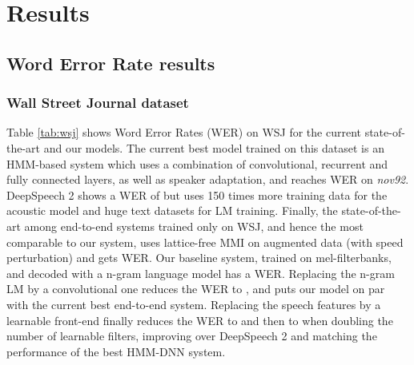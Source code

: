 \documentclass[a4paper]{article}
\begin{document}
\section{Results}
\label{sec:results}

\subsection{Word Error Rate results}

\subsubsection{Wall Street Journal dataset}
Table \ref{tab:wsj} shows Word Error Rates (WER) on WSJ for the current state-of-the-art and our models. The current best model trained on this dataset is an HMM-based system which uses a combination of convolutional, recurrent and fully connected layers, as well as speaker adaptation, and reaches  WER on \textit{nov92}. DeepSpeech 2 shows a WER of  but uses 150 times more training data for the acoustic model and huge text datasets for LM training. Finally, the state-of-the-art among end-to-end systems trained only on WSJ, and hence the most comparable to our system, uses lattice-free MMI on augmented data (with speed perturbation) and gets  WER. Our baseline system, trained on mel-filterbanks, and decoded with a n-gram language model has a  WER. Replacing the n-gram LM by a convolutional one reduces the WER to , and puts our model on par with the current best end-to-end system. Replacing the speech features by a learnable front-end finally reduces the WER to  and then to  when doubling the number of learnable filters, improving over DeepSpeech 2 and matching the performance of the best HMM-DNN system.
\end{document}
